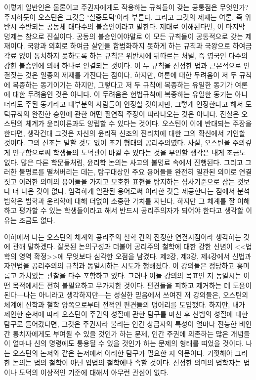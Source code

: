 이렇게 일반인은 물론이고 주권자에게도 작용하는 규칙들이 갖는
공통점은 무엇인가?
주지하듯이 오스틴은 그것을 `실증도덕'이라 부른다.
그리고 그것의 제재는 여론, 즉 위반시 수반되는 공동체 대다수의 불승인이라고
말한다.
제대로 이해된다면,
이 마지막 명제는 참으로 진실이다.
공동의 불승인이야말로 이 모든 규칙들이 공통적으로 갖는 제재이다.
국왕과 의회로 하여금 살인을 합법화하지 못하게 하는 규칙과
국왕으로 하여금 각료 없이 통치하지 못하도록 하는 규칙은
위반시에 뒤따르는 처벌, 즉 영국인 다수의 강한 불승인에 의해
하나로 연결되는 것이다.
이 두 규칙을 진정한 법과 근본적으로 연결짓는 것은
일종의 제재를 가진다는 점이다.
하지만,
여론에 대한 두려움이 저 두 규칙에 복종하는 동기이기는 하지만,
그렇다고 저 두 규칙에 복종하는 유일한 동기가 여론에 대한 두려움인 것은 아니다.
이 두려움은
헌법규칙에 복종하는
유일한 동기는 아니더라도 주된 동기라고 대부분의 사람들이 인정할 것이지만,
그렇게 인정한다고 해서 도덕규칙의 완전한 승인에 관한
어떤 필연적 주장이 따라나오는 것은 아니다.
진실은 오스틴의 체계가  윤리이론과도 양립할 수 있다는 것이다.
오스틴이 이에 반대되는 주장을 한다면,
생각건대 그것은 자신의 윤리적 신조의 진리치에 대한 그의 확신에서
기인할 것이다.
그의 신조는 말할 것도 없이 초기 형태의 공리주의였다.
사실,
오스틴을 주의깊게 연구함으로써 학생들의 도덕관이 바뀔 수 있다는 것을
부인할 생각은 내게 조금도 없다.
많은 다른 학문들처럼, 윤리학 논의는
사고의 불명료 속에서 진행된다.
그리고 그러한 불명료를 떨쳐버리는 데는,
탐구대상인 주요 용어들을 완전히 일관된 의미로 연결짓고
이러한 의미의 용어들을 가지고 모호한 표현을 탐지하는 심사기준으로
삼는 것보다 더 나은 것이 없다.
엄격하게 일관된 용어로써 이러한 것을 제공한다는 점에서
분석법학은 법학과 윤리학에 대해 더없이 소중한 가치를 지닌다.
하지만 그 체계를 잘 이해하고 평가할 수 있는 학생들이라고 해서
반드시 공리주의자가 되어야 한다고 생각할 이유는 조금도 없다.

이하에서 나는 오스틴의 체계와 공리주의 철학 간의 진정한 연결지점이라
생각하는 것에 관해 말하겠다.
잘못된 논의구성과 더불어 공리주의 철학에 대한 강한 신념이
<<법학의 영역 확정>>에 무엇보다 심각한 오점을 남겼다.
제2강, 제3강, 제4강에서
신법과 자연법을
공리주의의 규칙과 동일시하는 시도가 행해졌다.
이 강의들은 정당하고 흥미롭고 가치있는 관찰을 다수 포함하고 있다.
그러나 이들 강의의 목표인 저 동일시는
어떤 목적에서든
전혀 불필요하고 무가치한 것이다.
편견들을 피하고 제거하는 데 도움이 된다---나는 아니라고 생각하지만---는
성실한 믿음에서 쓰여진
저 강의들은,
오스틴의 체계에 신학과 철학 양쪽으로부터
전적인 편견들의 덩어리를 도입했다.
하지만,
내가 제안한 순서에 따라
오스틴이 주권의 성질에 관한 탐구를 마친 후
신법의 성질에 대한 탐구로 들어갔다면,
그것은
주권자라 불리는 인간 상급자의 특성이 얼마나
전능한 비인간 통치자에게도 부여될 수 있을 것인가 하는 문제,
인간 주권에 의존하는 많은 개념들이 얼마나
신의 명령에도 통용될 수 있을 것인가 하는 문제의 형태를 띠었을 것이다.
나는 오스틴의 논저와 같은 논저에서 이러한 탐구가 필요한 지 의문이다.
기껏해야
그러한 논의는
법의 철학이 아닌 입법의 철학에나
속할 것이다.
진정한 의미의 법학자는 법이나 도덕의 이상적인 기준에 대해서
아무런 관심이 없다.

